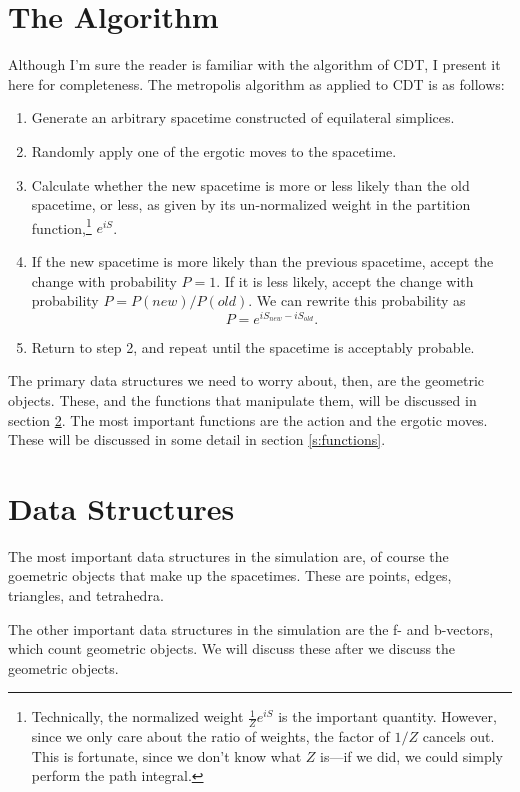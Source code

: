 \documentclass[12pt]{article}
\begin{document}
\section{The Algorithm}
\label{s:algorithm}
Although I'm sure the reader is familiar with the algorithm of CDT, I
present it here for completeness. The metropolis algorithm as applied
to CDT is as follows:
\begin{enumerate}
\item Generate an arbitrary spacetime constructed of equilateral simplices.
\item Randomly apply one of the ergotic moves to the spacetime.
\item Calculate whether the new spacetime is more or less likely than
  the old spacetime, or less, as given by its un-normalized weight in
  the partition function,\footnote{Technically, the normalized weight
    $\frac{1}{Z}e^{iS}$ is the important quantity. However, since we
    only care about the ratio of weights, the factor of $1/Z$ cancels
    out. This is fortunate, since we don't know what $Z$ is---if we
    did, we could simply perform the path integral.} $e^{i S}$.
\item If the new spacetime is more likely than the previous spacetime,
  accept the change with probability $P=1$. If it is less likely,
  accept the change with probability $P = P(new)/P(old)$. We can
  rewrite this probability as
  $$P = e^{i S_{new} - i S_{old}}.$$
\item Return to step 2, and repeat until the spacetime is acceptably
  probable.
\end{enumerate}
The primary data structures we need to worry about, then, are the
geometric objects. These, and the functions that manipulate them, will
be discussed in section \ref{s:data-structures}. The most important
functions are the action and the ergotic moves. These will be
discussed in some detail in section \ref{s:functions}.

\section{Data Structures}
\label{s:data-structures}

The most important data structures in the simulation are, of course
the goemetric objects that make up the spacetimes. These are points,
edges, triangles, and tetrahedra. 

The other important data structures in the simulation are the f- and
b-vectors, which count geometric objects. We will discuss these after
we discuss the geometric objects.
\end{document}
